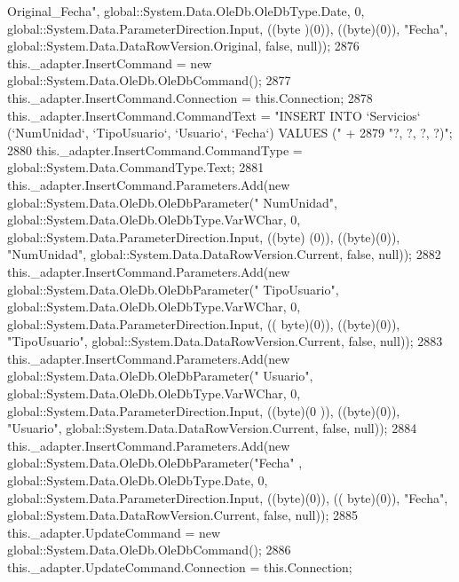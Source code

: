 \begin{DoxyCode}
{      Original\_Fecha"}, global::System.Data.OleDb.OleDbType.Date, 0, global::System.Data.ParameterDirection.Input, ((byte
      )(0)), ((byte)(0)), \textcolor{stringliteral}{"Fecha"}, global::System.Data.DataRowVersion.Original, \textcolor{keyword}{false}, null));
2876             this.\_adapter.InsertCommand = \textcolor{keyword}{new} global::System.Data.OleDb.OleDbCommand();
2877             this.\_adapter.InsertCommand.Connection = this.Connection;
2878             this.\_adapter.InsertCommand.CommandText = \textcolor{stringliteral}{"INSERT INTO `Servicios` (`NumUnidad`, `TipoUsuario`,
       `Usuario`, `Fecha`) VALUES ("} +
2879                 \textcolor{stringliteral}{"?, ?, ?, ?)"};
2880             this.\_adapter.InsertCommand.CommandType = global::System.Data.CommandType.Text;
2881             this.\_adapter.InsertCommand.Parameters.Add(\textcolor{keyword}{new} global::System.Data.OleDb.OleDbParameter(\textcolor{stringliteral}{"
      NumUnidad"}, global::System.Data.OleDb.OleDbType.VarWChar, 0, global::System.Data.ParameterDirection.Input, ((byte)
      (0)), ((byte)(0)), \textcolor{stringliteral}{"NumUnidad"}, global::System.Data.DataRowVersion.Current, \textcolor{keyword}{false}, null));
2882             this.\_adapter.InsertCommand.Parameters.Add(\textcolor{keyword}{new} global::System.Data.OleDb.OleDbParameter(\textcolor{stringliteral}{"
      TipoUsuario"}, global::System.Data.OleDb.OleDbType.VarWChar, 0, global::System.Data.ParameterDirection.Input, ((
      byte)(0)), ((byte)(0)), \textcolor{stringliteral}{"TipoUsuario"}, global::System.Data.DataRowVersion.Current, \textcolor{keyword}{false}, null));
2883             this.\_adapter.InsertCommand.Parameters.Add(\textcolor{keyword}{new} global::System.Data.OleDb.OleDbParameter(\textcolor{stringliteral}{"
      Usuario"}, global::System.Data.OleDb.OleDbType.VarWChar, 0, global::System.Data.ParameterDirection.Input, ((byte)(0
      )), ((byte)(0)), \textcolor{stringliteral}{"Usuario"}, global::System.Data.DataRowVersion.Current, \textcolor{keyword}{false}, null));
2884             this.\_adapter.InsertCommand.Parameters.Add(\textcolor{keyword}{new} global::System.Data.OleDb.OleDbParameter(\textcolor{stringliteral}{"Fecha"}
      , global::System.Data.OleDb.OleDbType.Date, 0, global::System.Data.ParameterDirection.Input, ((byte)(0)), ((
      byte)(0)), \textcolor{stringliteral}{"Fecha"}, global::System.Data.DataRowVersion.Current, \textcolor{keyword}{false}, null));
2885             this.\_adapter.UpdateCommand = \textcolor{keyword}{new} global::System.Data.OleDb.OleDbCommand();
2886             this.\_adapter.UpdateCommand.Connection = this.Connection;

\end{DoxyCode}
